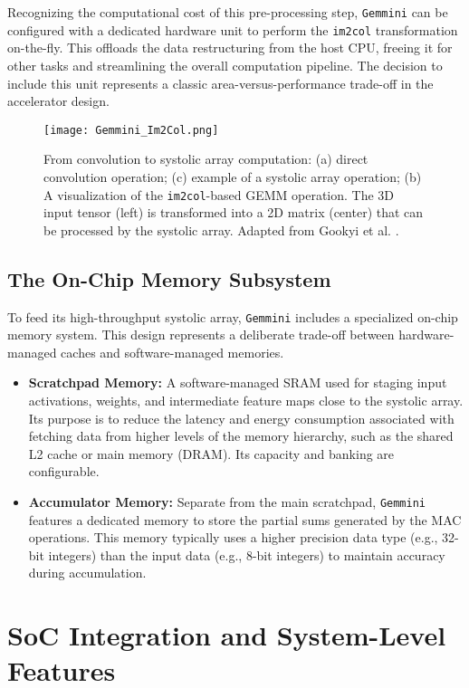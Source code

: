 Recognizing the computational cost of this pre-processing step, \texttt{Gemmini} can be configured with a dedicated hardware unit to perform the \texttt{im2col} transformation on-the-fly. This offloads the data restructuring from the host CPU, freeing it for other tasks and streamlining the overall computation pipeline. The decision to include this unit represents a classic area-versus-performance trade-off in the accelerator design.

\begin{figure}[h!]
    \centering
    \texttt{[image: Gemmini\_Im2Col.png]}
    \caption[The im2col Transformation]{From convolution to systolic array computation: (a) direct convolution operation; (c) example of a systolic array operation; (b) A visualization of the \texttt{im2col}-based GEMM operation. The 3D input tensor (left) is transformed into a 2D matrix (center) that can be processed by the systolic array. Adapted from Gookyi et al. \cite{gookyi2023gemmini_case_study}.}
    \label{fig:im2col}
\end{figure}


\subsection{The On-Chip Memory Subsystem}
To feed its high-throughput systolic array, \texttt{Gemmini} includes a specialized on-chip memory system. This design represents a deliberate trade-off between hardware-managed caches and software-managed memories.
\begin{itemize}
    \item \textbf{Scratchpad Memory:} A software-managed SRAM used for staging input activations, weights, and intermediate feature maps close to the systolic array. Its purpose is to reduce the latency and energy consumption associated with fetching data from higher levels of the memory hierarchy, such as the shared L2 cache or main memory (DRAM). Its capacity and banking are configurable.
    \item \textbf{Accumulator Memory:} Separate from the main scratchpad, \texttt{Gemmini} features a dedicated memory to store the partial sums generated by the MAC operations. This memory typically uses a higher precision data type (e.g., 32-bit integers) than the input data (e.g., 8-bit integers) to maintain accuracy during accumulation.
\end{itemize}

\section{SoC Integration and System-Level Features}
\label{sec:gemmini_integration}

